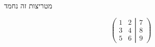 \documentclass{article}
\begin{document}
מטריצות זה נחמד

\[
    \left(
    \begin{matrix}
            1 & 2 \\
            3 & 4 \\
            5 & 6
        \end{matrix}
    \left|
    \begin{matrix}
            7 \\
            8 \\
            9
        \end{matrix}
    \right.
    \right)
\]
\end{document}
